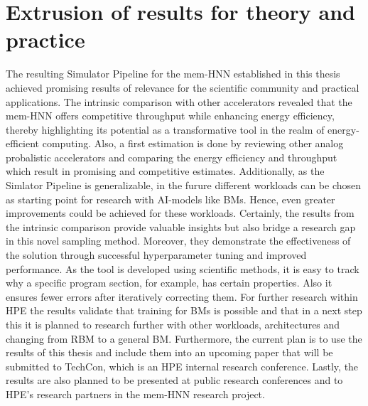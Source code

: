 \section{Extrusion of results for theory and practice}
The resulting Simulator Pipeline for the \ac{mem-HNN} established in this thesis achieved 
promising results of relevance for the scientific community and practical applications. 
The intrinsic comparison with other accelerators revealed that the \ac{mem-HNN} offers competitive throughput while enhancing energy efficiency,
thereby highlighting its potential as a transformative tool in the realm of energy-efficient computing.
Also, a first estimation is done by reviewing other analog probalistic accelerators and comparing the energy efficiency and throughput which result in promising and competitive estimates. 
Additionally, as the Simlator Pipeline is generalizable, in the furure different workloads can be chosen as starting point for research with AI-models 
like \ac{BM}s. 
Hence, even greater improvements could be achieved for these workloads.
Certainly, the results from the intrinsic comparison provide valuable insights but also bridge a research gap in this novel sampling method.
Moreover, they demonstrate the effectiveness of the solution through successful hyperparameter tuning and improved performance.
As the tool is developed using scientific methods, it is easy to track why a  specific program section, for example, has certain properties.
Also it ensures fewer errors after iteratively correcting them.
For further research within HPE the results validate that training for \ac{BM}s is possible and that in 
a next step this it is planned to research further with other workloads, architectures and changing from \ac{RBM} to a general \ac{BM}.
Furthermore, the current plan is to use the results of this thesis and include them into an upcoming paper 
that will be submitted to TechCon, which is an HPE internal research conference.
Lastly, the results are also planned to be presented at public research conferences and to HPE's research partners in the 
\ac{mem-HNN} research project. 

